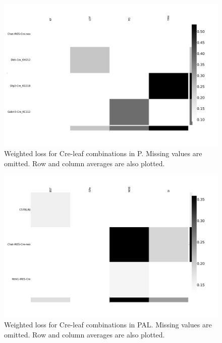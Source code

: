 \begin{figure}[H]
    \centering
    \includegraphics[width = 7in]{figs/lossdetails_771.png} 
    \caption{Weighted loss for Cre-leaf combinations in P. Missing values are omitted.    Row and column averages are also plotted.}
\end{figure}
\begin{figure}[H]
    \centering
    \includegraphics[width = 7in]{figs/lossdetails_803.png} 
    \caption{Weighted loss for Cre-leaf combinations in PAL. Missing values are omitted.  Row and column averages are also plotted.}
\end{figure}

